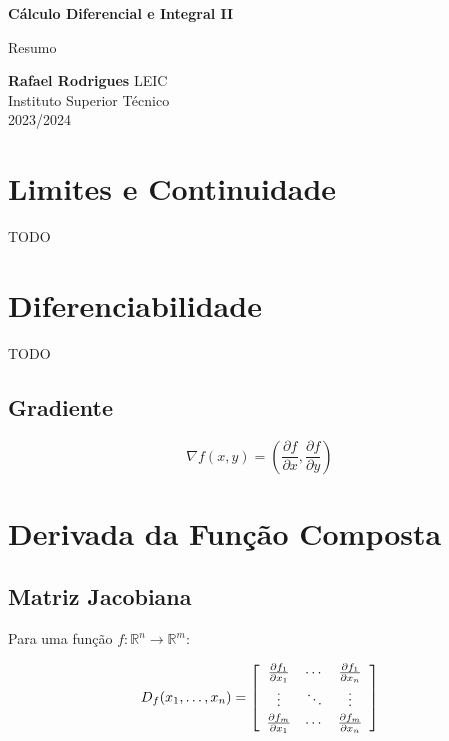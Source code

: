 \documentclass[11pt, a4paper]{article}
\begin{document}
\begin{titlepage}
    \begin{center}
        \vspace*{5cm}

        \textbf{\LARGE Cálculo Diferencial e Integral II}
        \vspace{1cm}

        \Large Resumo
        \vspace{2cm}

        \textbf{Rafael Rodrigues}
        \vfill
        LEIC \\
        Instituto Superior Técnico \\
        2023/2024
    \end{center}
\end{titlepage}

\tableofcontents

\newpage
\section{Limites e Continuidade}

TODO

\section{Diferenciabilidade}

TODO

\subsection{Gradiente}

\begin{equation*}
    \nabla f(x, y) = \left(\frac{\partial f}{\partial x}, \frac{\partial f}{\partial y}\right)
\end{equation*}

\section{Derivada da Função Composta}

\subsection{Matriz Jacobiana}

Para uma função $f: \mathbb{R}^n \to \mathbb{R}^m$:

\begin{equation*}
    D_f(x_1, \ldots, x_n) =
    \left[
        \begin{array}{c c c}
            \frac{\partial f_1}{\partial x_1} & \cdots &
            \frac{\partial f_1}{\partial x_n} \vspace{2pt}                   \\
            \vdots                            & \ddots & \vdots \vspace{2pt} \\
            \frac{\partial f_m}{\partial x_1} & \cdots &
            \frac{\partial f_m}{\partial x_n}
        \end{array}
        \right]
\end{equation*}
\end{document}
